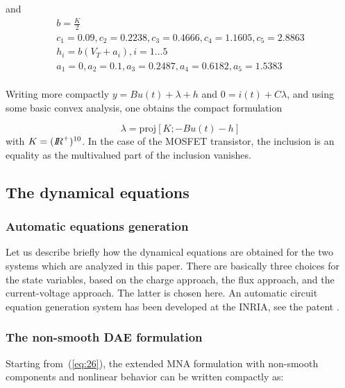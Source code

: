 \documentclass{article}
\newcommand{\RR}{\mbox{\rm $I\!\!R$}}
\begin{document}
and 
\begin{equation}
  \label{eq:70}
  \begin{array}{l}
  b = \frac{K}{2} \\
  c_1 = 0.09 , c_2=0.2238 , c_3=0.4666 , c_4=1.1605 , c_5=2.8863 \\
  h_i = b(V_T+a_i), i =1\ldots 5 \\
  a_1 = 0 , a_2=0.1, a_3=0.2487 , a_4=0.6182 , a_5=1.5383 \\
\end{array}
\end{equation}


Writing more compactly $y=Bu(t)+\lambda+h$ and $0=i(t)+C\lambda$, and using some basic convex analysis, one obtains the compact formulation

\begin{equation}
\lambda=\mbox{proj}[K; -Bu(t)-h]
\end{equation}
with $K=(\RR^{+})^{10}$. In the case of the MOSFET transistor, the inclusion is an equality as the multivalued part of the inclusion vanishes. 






\subsection{The dynamical equations}
\label{section22}


\subsubsection{Automatic equations generation}

Let us describe briefly how the dynamical equations are obtained for the two systems which are analyzed in this paper. There are basically three choices for the state variables, based on the charge approach, the flux approach, and the current-voltage approach. The latter is chosen here. An automatic circuit equation generation system has been developed at the INRIA, see the patent \cite{}. 




\subsubsection{The non-smooth DAE formulation}


Starting from~(\ref{eq:26}), the extended MNA formulation with non-smooth components and nonlinear behavior can  be written compactly as:
\end{document}

